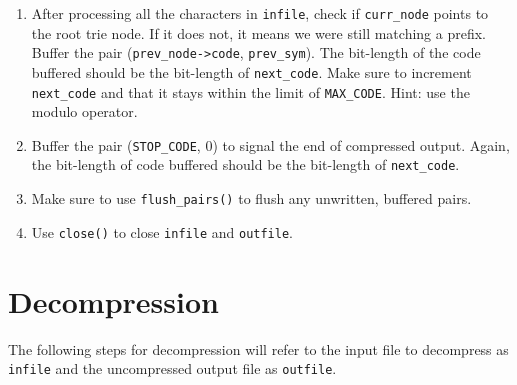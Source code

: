 \documentclass{article}
\begin{document}
\begin{enumerate}
    \item After processing all the characters in \texttt{infile}, check if
        \texttt{curr\_node} points to the root trie node. If it does not, it
        means we were still matching a prefix. Buffer the pair
        (\texttt{prev\_node->code}, \texttt{prev\_sym}). The bit-length of the
        code buffered should be the bit-length of \texttt{next\_code}. Make sure
        to increment \texttt{next\_code} and that it stays within the limit of
        \texttt{MAX\_CODE}. Hint: use the modulo operator.

    \item Buffer the pair (\texttt{STOP\_CODE}, 0) to signal the end of
        compressed output. Again, the bit-length of code buffered should be the
        bit-length of \texttt{next\_code}.

    \item Make sure to use \texttt{flush\_pairs()} to flush any unwritten,
        buffered pairs.

    \item Use \texttt{close()} to close \texttt{infile} and \texttt{outfile}.
\end{enumerate}

\section{Decompression}

The following steps for decompression will refer to the input file to decompress
as \texttt{infile} and the uncompressed output file as \texttt{outfile}.
\end{document}
